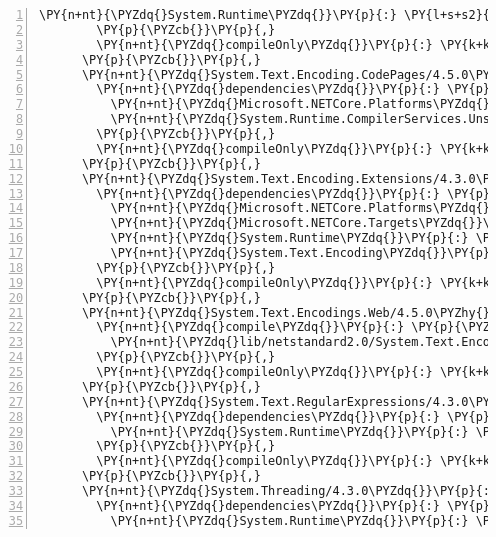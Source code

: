 \begin{Verbatim}[commandchars=\\\{\},numbers=left,firstnumber=1,stepnumber=1,numberblanklines=0]
          \PY{n+nt}{\PYZdq{}System.Runtime\PYZdq{}}\PY{p}{:} \PY{l+s+s2}{\PYZdq{}4.3.0\PYZdq{}}
        \PY{p}{\PYZcb{}}\PY{p}{,}
        \PY{n+nt}{\PYZdq{}compileOnly\PYZdq{}}\PY{p}{:} \PY{k+kc}{true}
      \PY{p}{\PYZcb{}}\PY{p}{,}
      \PY{n+nt}{\PYZdq{}System.Text.Encoding.CodePages/4.5.0\PYZhy{}rc1\PYZdq{}}\PY{p}{:} \PY{p}{\PYZob{}}
        \PY{n+nt}{\PYZdq{}dependencies\PYZdq{}}\PY{p}{:} \PY{p}{\PYZob{}}
          \PY{n+nt}{\PYZdq{}Microsoft.NETCore.Platforms\PYZdq{}}\PY{p}{:} \PY{l+s+s2}{\PYZdq{}2.1.0\PYZhy{}rc1\PYZdq{}}\PY{p}{,}
          \PY{n+nt}{\PYZdq{}System.Runtime.CompilerServices.Unsafe\PYZdq{}}\PY{p}{:} \PY{l+s+s2}{\PYZdq{}4.5.0\PYZhy{}rc1\PYZdq{}}
        \PY{p}{\PYZcb{}}\PY{p}{,}
        \PY{n+nt}{\PYZdq{}compileOnly\PYZdq{}}\PY{p}{:} \PY{k+kc}{true}
      \PY{p}{\PYZcb{}}\PY{p}{,}
      \PY{n+nt}{\PYZdq{}System.Text.Encoding.Extensions/4.3.0\PYZdq{}}\PY{p}{:} \PY{p}{\PYZob{}}
        \PY{n+nt}{\PYZdq{}dependencies\PYZdq{}}\PY{p}{:} \PY{p}{\PYZob{}}
          \PY{n+nt}{\PYZdq{}Microsoft.NETCore.Platforms\PYZdq{}}\PY{p}{:} \PY{l+s+s2}{\PYZdq{}2.1.0\PYZhy{}rc1\PYZdq{}}\PY{p}{,}
          \PY{n+nt}{\PYZdq{}Microsoft.NETCore.Targets\PYZdq{}}\PY{p}{:} \PY{l+s+s2}{\PYZdq{}2.1.0\PYZhy{}rc1\PYZdq{}}\PY{p}{,}
          \PY{n+nt}{\PYZdq{}System.Runtime\PYZdq{}}\PY{p}{:} \PY{l+s+s2}{\PYZdq{}4.3.0\PYZdq{}}\PY{p}{,}
          \PY{n+nt}{\PYZdq{}System.Text.Encoding\PYZdq{}}\PY{p}{:} \PY{l+s+s2}{\PYZdq{}4.3.0\PYZdq{}}
        \PY{p}{\PYZcb{}}\PY{p}{,}
        \PY{n+nt}{\PYZdq{}compileOnly\PYZdq{}}\PY{p}{:} \PY{k+kc}{true}
      \PY{p}{\PYZcb{}}\PY{p}{,}
      \PY{n+nt}{\PYZdq{}System.Text.Encodings.Web/4.5.0\PYZhy{}rc1\PYZdq{}}\PY{p}{:} \PY{p}{\PYZob{}}
        \PY{n+nt}{\PYZdq{}compile\PYZdq{}}\PY{p}{:} \PY{p}{\PYZob{}}
          \PY{n+nt}{\PYZdq{}lib/netstandard2.0/System.Text.Encodings.Web.dll\PYZdq{}}\PY{p}{:} \PY{p}{\PYZob{}}\PY{p}{\PYZcb{}}
        \PY{p}{\PYZcb{}}\PY{p}{,}
        \PY{n+nt}{\PYZdq{}compileOnly\PYZdq{}}\PY{p}{:} \PY{k+kc}{true}
      \PY{p}{\PYZcb{}}\PY{p}{,}
      \PY{n+nt}{\PYZdq{}System.Text.RegularExpressions/4.3.0\PYZdq{}}\PY{p}{:} \PY{p}{\PYZob{}}
        \PY{n+nt}{\PYZdq{}dependencies\PYZdq{}}\PY{p}{:} \PY{p}{\PYZob{}}
          \PY{n+nt}{\PYZdq{}System.Runtime\PYZdq{}}\PY{p}{:} \PY{l+s+s2}{\PYZdq{}4.3.0\PYZdq{}}
        \PY{p}{\PYZcb{}}\PY{p}{,}
        \PY{n+nt}{\PYZdq{}compileOnly\PYZdq{}}\PY{p}{:} \PY{k+kc}{true}
      \PY{p}{\PYZcb{}}\PY{p}{,}
      \PY{n+nt}{\PYZdq{}System.Threading/4.3.0\PYZdq{}}\PY{p}{:} \PY{p}{\PYZob{}}
        \PY{n+nt}{\PYZdq{}dependencies\PYZdq{}}\PY{p}{:} \PY{p}{\PYZob{}}
          \PY{n+nt}{\PYZdq{}System.Runtime\PYZdq{}}\PY{p}{:} \PY{l+s+s2}{\PYZdq{}4.3.0\PYZdq{}}\PY{p}{,}

\end{Verbatim}
